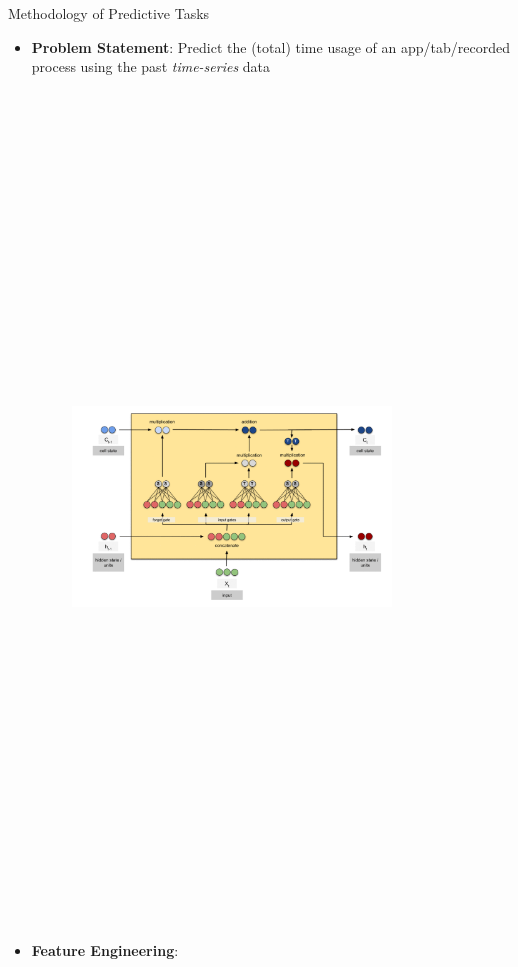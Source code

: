 \documentclass[final]{beamer}
\newlength{\colwidth}
\begin{document}
\begin{frame}[t]
\begin{columns}[t]
\begin{column}{\colwidth}
\begin{exampleblock}{\huge{Methodology of Predictive Tasks}}
{          

          \begin{itemize}
            \item \textbf{Problem Statement}: Predict the (total) time usage of an app/tab/recorded process using the past \textit{time-series} data
                  \begin{figure}\hspace*{-2cm}\includegraphics[width=0.8\textwidth, height=22cm]{lstm-lt.jpeg}\end{figure}

            \item \textbf{Feature Engineering}:


\end{itemize}}
\end{exampleblock}
\end{column}
\end{columns}
\end{frame}
\end{document}
